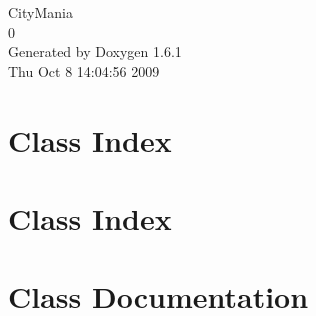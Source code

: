 \documentclass[letterpaper]{book}
\begin{document}
\hypersetup{pageanchor=false}
\begin{titlepage}
\vspace*{7cm}
\begin{center}
{\Large CityMania \\[1ex]\large 0 }\\
\vspace*{1cm}
{\large Generated by Doxygen 1.6.1}\\
\vspace*{0.5cm}
{\small Thu Oct 8 14:04:56 2009}\\
\end{center}
\end{titlepage}
\clearemptydoublepage
{}
\tableofcontents
\clearemptydoublepage
{}
\hypersetup{pageanchor=true}
\chapter{Class Index}

\chapter{Class Index}

\chapter{Class Documentation}







































\printindex
\end{document}
